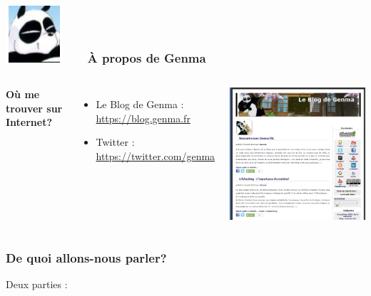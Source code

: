 \documentclass{beamer}
\begin{document}
\begin{frame}
\frametitle{\includegraphics[scale=0.4]{./images/Genma.jpg} \ \ \  À propos de Genma  }
\begin{columns}[c] 
\textbf{Où me trouver sur Internet?}
\begin{itemize}
\item Le Blog de Genma : \url{https://blog.genma.fr}
\item Twitter : \url{https://twitter.com/genma}
\end{itemize}
\includegraphics[scale=0.40] {./images/blog.png} 
\end{columns}
\end{frame}

\begin{frame}
\frametitle{De quoi allons-nous parler? }
Deux parties :
\begin{itemize}
\end{itemize}
\end{frame}
\end{document}
